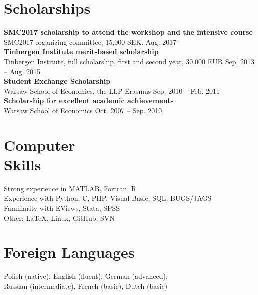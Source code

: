 \documentclass[margin,line]{resume}
\begin{document}
\begin{resume}
   \section{\mysidestyle Scholarships}	
   	\textbf{SMC2017 scholarship to attend the workshop and the intensive course}\\ SMC2017 organizing committee, 15,000 SEK. \hfill Aug. 2017 \vspace{1.5mm} \\   
   	\textbf{Tinbergen Institute merit-based scholarship}\\ Tinbergen Institute, full scholarship, first and second year, 30,000 EUR \hfill Sep. 2013 -- Aug. 2015\vspace{1.5mm} \\   
       \textbf{Student Exchange Scholarship}\\  Warsaw School of Economics, the LLP Erasmus \hfill Sep. 2010 -- Feb. 2011\vspace{1.5mm} \\
       \textbf{Scholarship for excellent academic achievements}\\ Warsaw School of Economics \hfill Oct. 2007 -- Sep. 2010 


   \section{\mysidestyle Computer\\ Skills} 
   Strong experience in MATLAB, Fortran, R   \vspace{1mm}\\
   Experience with Python, C, PHP, Visual Basic, SQL, BUGS/JAGS \vspace{1mm}\\
	Familiarity with EViews, Stata, SPSS \vspace{1mm} \\
	Other: \LaTeX, Linux, GitHub, SVN  

   \section{\mysidestyle Foreign Languages}  
	Polish (native), English (fluent),  German (advanced),    \\
    Russian (intermediate),  French (basic),  Dutch (basic)

 
    

\end{resume}
\end{document}
